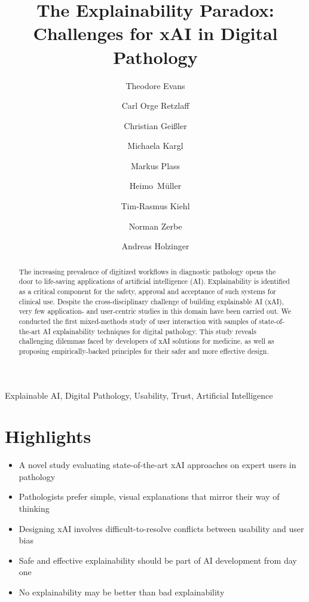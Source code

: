 \documentclass[final,5p,times,twocolumn,hyphens]{elsarticle}
\def\corref#1{}%
\begin{document}
\begin{frontmatter}

\title{The Explainability Paradox: Challenges for xAI in Digital Pathology}

\author[TUB]{Theodore Evans\corref{mycorrespondingauthor}}
\author[TUB]{Carl Orge Retzlaff}
\author[TUB]{Christian Geißler}
\author[MUG]{Michaela Kargl}
\author[MUG]{Markus Plass}
\author[MUG]{Heimo~M{\"u}ller}
\author[CAR]{Tim-Rasmus Kiehl}
\author[CAR]{Norman Zerbe}
\author[MUG]{Andreas Holzinger }

\address[TUB]{DAI-Labor, Technical University Berlin, Germany}
\address[MUG]{Medical University Graz, Austria}
\address[CAR]{Charité – Universit{\"a}tsmedizin Berlin, corporate member of Freie Universit{\"a}t Berlin and Humboldt- Universit{\"a}t zu Berlin, Institute of Pathology, Germany}

\begin{abstract} 
The increasing prevalence of digitized workflows in diagnostic pathology opens the door to life-saving applications of artificial intelligence (AI). Explainability is identified as a critical component for the safety, approval and acceptance of such systems for clinical use. Despite the cross-disciplinary challenge of building explainable AI (xAI), very few application- and user-centric studies in this domain have been carried out. We conducted the first mixed-methods study of user interaction with samples of state-of-the-art AI explainability techniques for digital pathology. This study reveals challenging dilemmas faced by developers of xAI solutions for medicine, as well as proposing empirically-backed principles for their safer and more effective design.
\end{abstract}

\begin{keyword}
Explainable AI, Digital Pathology, Usability, Trust, Artificial Intelligence
\end{keyword}

\end{frontmatter}
\linenumbers

\section*{\textbf{Highlights}}

\begin{itemize}
    \item A novel study evaluating state-of-the-art xAI approaches on expert users in pathology
    \item Pathologists prefer simple, visual explanations that mirror their way of thinking
    \item Designing xAI involves difficult-to-resolve conflicts between usability and user bias
    \item Safe and effective explainability should be part of AI development from day one
    \item No explainability may be better than bad explainability
\end{itemize}
\end{document}
